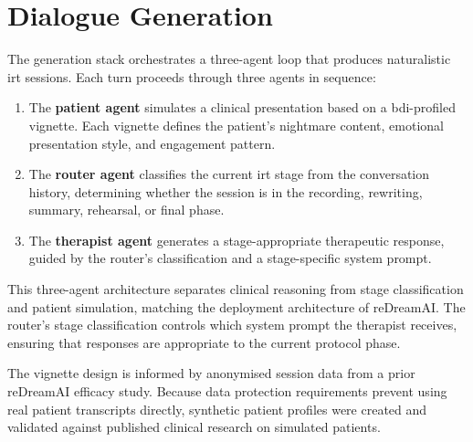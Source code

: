\section{Dialogue Generation}
\label{sec:meth-dialogue}

The generation stack orchestrates a three-agent loop that produces
naturalistic \gls{irt} sessions. Each turn proceeds through three agents in
sequence:

\begin{enumerate}
  \item The \textbf{patient agent} simulates a clinical presentation based on
    a \gls{bdi}-profiled vignette. Each vignette defines the patient's
    nightmare content, emotional presentation style, and engagement pattern.
  \item The \textbf{router agent} classifies the current \gls{irt} stage
    from the conversation history, determining whether the session is in the
    recording, rewriting, summary, rehearsal, or final phase.
  \item The \textbf{therapist agent} generates a stage-appropriate
    therapeutic response, guided by the router's classification and a
    stage-specific system prompt.
\end{enumerate}

This three-agent architecture separates clinical reasoning from stage
classification and patient simulation, matching the deployment architecture
of reDreamAI. The router's stage classification controls which system prompt
the therapist receives, ensuring that responses are appropriate to the
current protocol phase.

The vignette design is informed by anonymised session data from a prior
reDreamAI efficacy study. Because data protection requirements prevent
using real patient transcripts directly, synthetic patient profiles were
created and validated against published clinical research on simulated
patients.

